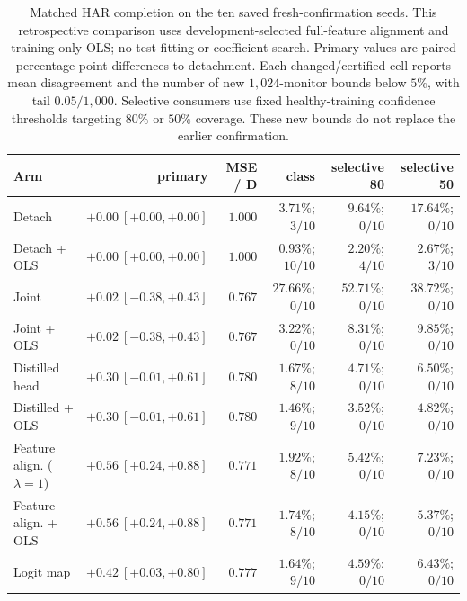 \begin{table}[htbp]
\centering
\caption{Matched HAR completion on the ten saved fresh-confirmation seeds. This retrospective comparison uses development-selected full-feature alignment and training-only OLS; no test fitting or coefficient search. Primary values are paired percentage-point differences to detachment. Each changed/certified cell reports mean disagreement and the number of new $1{,}024$-monitor bounds below $5\%$, with tail $0.05/1{,}000$. Selective consumers use fixed healthy-training confidence thresholds targeting $80\%$ or $50\%$ coverage. These new bounds do not replace the earlier confirmation.}
\label{tab:completion_controls}
\footnotesize
\setlength{\tabcolsep}{3pt}
\begin{tabular}{lrrrrr}
\toprule
Arm & primary & MSE / D & class & selective 80 & selective 50 \\
\midrule
Detach & $+0.00\ [+0.00,+0.00]$ & $1.000$ & $3.71\%$; $3/10$ & $9.64\%$; $0/10$ & $17.64\%$; $0/10$ \\
Detach + OLS & $+0.00\ [+0.00,+0.00]$ & $1.000$ & $0.93\%$; $10/10$ & $2.20\%$; $4/10$ & $2.67\%$; $3/10$ \\
Joint & $+0.02\ [-0.38,+0.43]$ & $0.767$ & $27.66\%$; $0/10$ & $52.71\%$; $0/10$ & $38.72\%$; $0/10$ \\
Joint + OLS & $+0.02\ [-0.38,+0.43]$ & $0.767$ & $3.22\%$; $0/10$ & $8.31\%$; $0/10$ & $9.85\%$; $0/10$ \\
Distilled head & $+0.30\ [-0.01,+0.61]$ & $0.780$ & $1.67\%$; $8/10$ & $4.71\%$; $0/10$ & $6.50\%$; $0/10$ \\
Distilled + OLS & $+0.30\ [-0.01,+0.61]$ & $0.780$ & $1.46\%$; $9/10$ & $3.52\%$; $0/10$ & $4.82\%$; $0/10$ \\
Feature align. ($\lambda=1$) & $+0.56\ [+0.24,+0.88]$ & $0.771$ & $1.92\%$; $8/10$ & $5.42\%$; $0/10$ & $7.23\%$; $0/10$ \\
Feature align. + OLS & $+0.56\ [+0.24,+0.88]$ & $0.771$ & $1.74\%$; $8/10$ & $4.15\%$; $0/10$ & $5.37\%$; $0/10$ \\
Logit map & $+0.42\ [+0.03,+0.80]$ & $0.777$ & $1.64\%$; $9/10$ & $4.59\%$; $0/10$ & $6.43\%$; $0/10$ \\
\bottomrule
\end{tabular}
\end{table}
